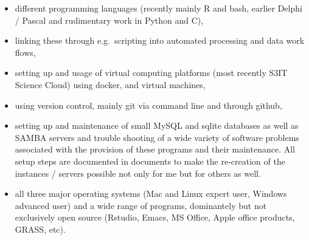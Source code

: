 \documentclass[a4paper]{article}
\begin{document}
\begin{itemize}[leftmargin=1.1in]

\item different programming languages (recently mainly R and bash,
	earlier Delphi / Pascal and rudimentary work in Python and C),

\item linking these through e.g.\ scripting into automated processing
	and data work flows,

\item setting up and usage of virtual computing platforms (most
	recently S3IT Science Cloud) using docker, and virtual machines,

\item using version control, mainly git via command line and through github,

\item setting up and maintenance of small MySQL and sqlite databases as
	well as SAMBA servers and trouble shooting of a wide variety of
	software problems associated with the provision of these programs and
	their maintenance. All setup steps are documented in documents to
	make the re-creation of the instances / servers possible not only for
	me but for others as well.

\item all three major operating systems (Mac and Linux expert
	user, Windows advanced user) and a wide range of programs,
	dominantely but not exclusively open source (Rstudio, Emacs, MS
	Office, Apple office products, GRASS, etc).

\end{itemize}
    

    

    



\end{document}
